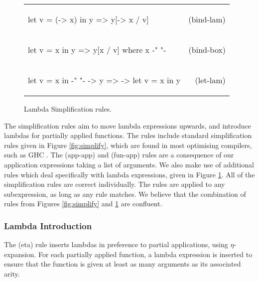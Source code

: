 \documentclass[preprint]{sigplanconf}
\newcommand{\simp}[2]{\begin{minipage}{6.4cm}#2\end{minipage} & (#1) \\}
\newenvironment{simplify}
    {\noindent
     \begin{flushright}
     \begin{tabular}{p{6.5cm}r}
    }
    {\end{tabular}
     \end{flushright}
    }
\begin{document}
\begin{figure}
\begin{simplify}

\simp{bind-lam}{
\ignore\begin{code}
let v = (\w -> x) in y
    => y[\w -> x / v]
\end{code}}

\simp{bind-box}{
\ignore\begin{code}
let v = x in y
    => y[x / v]
    where x {-" \text{ is a boxed lambda (see \S\ref{sec:inlining})} "-}
\end{code}}

\simp{let-lam}{
\ignore\begin{code}
let v = x in {-" "-} \w -> y
    => \w -> let v = x in y
\end{code}}

\end{simplify}
\caption{Lambda Simplification rules.}
\label{fig:lambda_simplify}
\end{figure}

The simplification rules aim to move lambda expressions upwards, and introduce lambdas for partially applied functions. The rules include standard simplification rules given in Figure \ref{fig:simplify}, which are found in most optimising compilers, such as GHC \cite{spj:transformation}. The (app-app) and (fun-app) rules are a consequence of our application expressions taking a list of arguments. We also make use of additional rules which deal specifically with lambda expressions, given in Figure \ref{fig:lambda_simplify}. All of the simplification rules are correct individually. The rules are applied to any subexpression, as long as any rule matches. We believe that the combination of rules from Figures \ref{fig:simplify} and \ref{fig:lambda_simplify} are confluent.

\subsubsection{Lambda Introduction}

The (eta) rule inserts lambdas in preference to partial applications, using $\eta$-expansion. For each partially applied function, a lambda expression is inserted to ensure that the function is given at least as many arguments as its associated arity.
\end{document}
